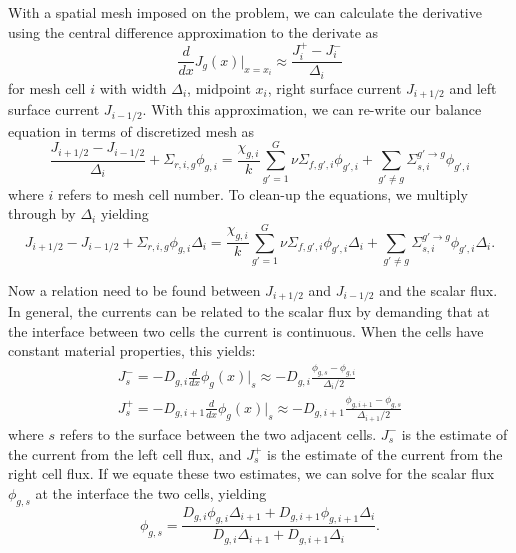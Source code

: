 \documentclass[12pt]{report}
\begin{document}
	With a spatial mesh imposed on the problem, we can calculate the derivative using the central difference approximation to the derivate as
	\begin{equation}
	\frac{d}{dx} J_g(x) \Bigr|_{x=x_i}	\approx \frac{J_i^+ - J_i^-}{\Delta_i}
	\end{equation}
	for mesh cell $i$ with width $\Delta_i$, midpoint $x_i$, right surface current $J_{i+1/2}$ and left surface current $J_{i-1/2}$.  With this approximation, we can re-write our balance equation in terms of discretized mesh as
	\begin{equation}
	\frac{J_{i+1/2} - J_{i-1/2}}{\Delta_i} + \Sigma_{r,i,g} \phi_{g,i} = \frac{\chi_{g,i}}{k} \sum_{g'=1}^{G} \nu \Sigma_{f,g',i} \phi_{g',i} + \sum_{g'\neq g} \Sigma_{s,i}^{g' \rightarrow g} \phi_{g',i}
	\end{equation}
	where $i$ refers to mesh cell number. To clean-up the equations, we multiply through by $\Delta_i$ yielding
	\begin{equation}
	J_{i+1/2} - J_{i-1/2} + \Sigma_{r,i,g} \phi_{g,i} \Delta_i = \frac{\chi_{g,i}}{k} \sum_{g'=1}^{G} \nu \Sigma_{f,g',i} \phi_{g',i} \Delta_i + \sum_{g'\neq g} \Sigma_{s,i}^{g' \rightarrow g} \phi_{g',i} \Delta_i.
	\end{equation}
	
	Now a relation need to be found between $J_{i+1/2}$ and $J_{i-1/2}$ and the scalar flux. In general, the currents can be related to the scalar flux by demanding that at the interface between two cells the current is continuous. When the cells have constant material properties, this yields:
	\begin{eqnarray}
	J_s^- = -D_{g,i} \frac{d}{dx} \phi_g(x) \bigr|_{s} \approx -D_{g,i} \frac{\phi_{g,s} - \phi_{g,i}}{\Delta_i/2} \\
	J_s^+ = -D_{g,i+1} \frac{d}{dx} \phi_g(x) \bigr|_{s} \approx -D_{g,i+1} \frac{\phi_{g,i+1} - \phi_{g,s}}{\Delta_{i+1}/2}
	\end{eqnarray}
	where $s$ refers to the surface between the two adjacent cells. $J_s^-$ is the estimate of the current from the left cell flux, and $J_s^+$ is the estimate of the current from the right cell flux. If we equate these two estimates, we can solve for the scalar flux $\phi_{g,s}$ at the interface the two cells, yielding
	\begin{equation}
	\phi_{g,s} = \frac{D_{g,i} \phi_{g,i}\Delta_{i+1} + D_{g,i+1}\phi_{g,i+1} \Delta_i}{D_{g,i} \Delta_{i+1} + D_{g,i+1} \Delta_i}.
	\end{equation}
	
\end{document}
